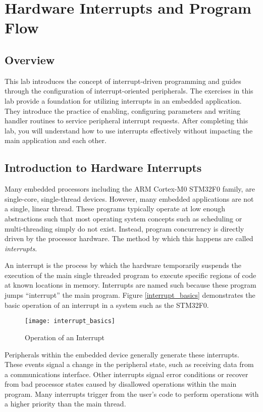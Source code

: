 \documentclass[11pt,fleqn]{book} %
\begin{document}
	
\chapter{Hardware Interrupts and Program Flow}

\section{Overview}
This lab introduces the concept of interrupt-driven programming and guides through the configuration of interrupt-oriented peripherals. The exercises in this lab provide a foundation for utilizing interrupts in an embedded application. They introduce the practice of enabling, configuring parameters and writing handler routines to service peripheral interrupt requests. After completing this lab, you will understand how to use interrupts effectively without impacting the main application and each other. 

\section{Introduction to Hardware Interrupts}
Many embedded processors including the ARM Cortex-M0 STM32F0 family, are single-core, single-thread devices. However, many embedded applications are not a single, linear thread. These programs typically operate at low enough abstractions such that most operating system concepts such as scheduling or multi-threading simply do not exist. Instead, program concurrency is directly driven by the processor hardware. The method by which this happens are called \textit{interrupts}. 

An interrupt is the process by which the hardware temporarily suspends the execution of the main single threaded program to execute specific regions of code at known locations in memory. Interrupts are named such because these program jumps ``interrupt'' the main program. Figure \vref{interrupt_basics} demonstrates the basic operation of an interrupt in a system such as the STM32F0. 

\begin{figure}[h]
    \centering\texttt{[image: interrupt\_basics]}
    \caption{Operation of an Interrupt}
    \label{interrupt_basics}
\end{figure}

Peripherals within the embedded device generally generate these interrupts. These events signal a change in the peripheral state, such as receiving data from a communications interface. Other interrupts signal error conditions or recover from bad processor states caused by disallowed operations within the main program. Many interrupts trigger from the user's code to perform operations with a higher priority than the main thread. 
\end{document}
